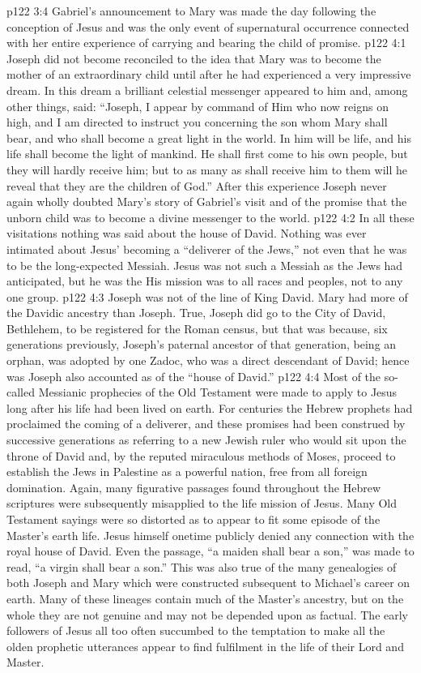 \vs p122 3:4 \pc Gabriel’s announcement to Mary was made the day following the conception of Jesus and was the only event of supernatural occurrence connected with her entire experience of carrying and bearing the child of promise.
\vs p122 4:1 Joseph did not become reconciled to the idea that Mary was to become the mother of an extraordinary child until after he had experienced a very impressive dream. In this dream a brilliant celestial messenger appeared to him and, among other things, said: “Joseph, I appear by command of Him who now reigns on high, and I am directed to instruct you concerning the son whom Mary shall bear, and who shall become a great light in the world. In him will be life, and his life shall become the light of mankind. He shall first come to his own people, but they will hardly receive him; but to as many as shall receive him to them will he reveal that they are the children of God.” After this experience Joseph never again wholly doubted Mary’s story of Gabriel’s visit and of the promise that the unborn child was to become a divine messenger to the world.
\vs p122 4:2 \pc In all these visitations nothing was said about the house of David. Nothing was ever intimated about Jesus’ becoming a “deliverer of the Jews,” not even that he was to be the long\hyp{}expected Messiah. Jesus was not such a Messiah as the Jews had anticipated, but he was the  His mission was to all races and peoples, not to any one group.
\vs p122 4:3 Joseph was not of the line of King David. Mary had more of the Davidic ancestry than Joseph. True, Joseph did go to the City of David, Bethlehem, to be registered for the Roman census, but that was because, six generations previously, Joseph’s paternal ancestor of that generation, being an orphan, was adopted by one Zadoc, who was a direct descendant of David; hence was Joseph also accounted as of the “house of David.”
\vs p122 4:4 Most of the so\hyp{}called Messianic prophecies of the Old Testament were made to apply to Jesus long after his life had been lived on earth. For centuries the Hebrew prophets had proclaimed the coming of a deliverer, and these promises had been construed by successive generations as referring to a new Jewish ruler who would sit upon the throne of David and, by the reputed miraculous methods of Moses, proceed to establish the Jews in Palestine as a powerful nation, free from all foreign domination. Again, many figurative passages found throughout the Hebrew scriptures were subsequently misapplied to the life mission of Jesus. Many Old Testament sayings were so distorted as to appear to fit some episode of the Master’s earth life. Jesus himself onetime publicly denied any connection with the royal house of David. Even the passage, “a maiden shall bear a son,” was made to read, “a virgin shall bear a son.” This was also true of the many genealogies of both Joseph and Mary which were constructed subsequent to Michael’s career on earth. Many of these lineages contain much of the Master’s ancestry, but on the whole they are not genuine and may not be depended upon as factual. The early followers of Jesus all too often succumbed to the temptation to make all the olden prophetic utterances appear to find fulfilment in the life of their Lord and Master.
